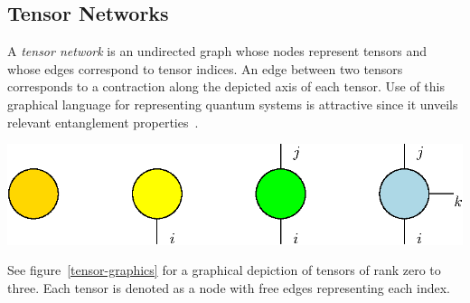 \documentclass[12pt]{article}
\newenvironment{Figure}
  {\par\medskip\noindent\minipage{\linewidth}}
  {\endminipage\par\medskip}
\begin{document}
\begin{multicols}{2}
	\subsection{Tensor Networks}
	A \textit{tensor network} is an undirected graph whose nodes
	represent tensors and whose edges correspond to tensor indices. An
	edge between two tensors corresponds to a contraction along the
	depicted axis of each tensor. Use of this graphical language for
	representing quantum systems is attractive since it unveils relevant
	entanglement properties~\cite{TnIntro}.
	\begin{Figure}
		\center\includegraphics[width=.9\textwidth]{./Figures/tensors.eps}
		\label{tensor-graphics}
	\end{Figure}
	See figure~\ref{tensor-graphics} for a graphical depiction of
	tensors of rank zero to three. Each tensor is denoted as a node with
	free edges representing each index.


\end{multicols}
\end{document}
